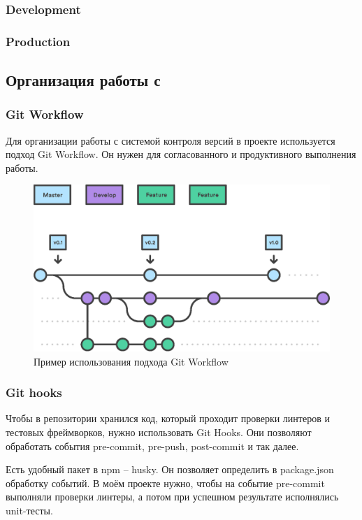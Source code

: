 \subsubsection{Development}
\subsubsection{Production}

\subsection{Организация работы с \textcite{git}}
\subsubsection{Git Workflow}
Для организации работы с системой контроля версий в проекте используется подход Git Workflow. Он нужен для согласованного и продуктивного выполнения работы.

\begin{figure}[h!]
    \begin{center}
        \includegraphics[scale=0.6]{images/git-workflow.eps}
    \end{center}
    \caption{Пример использования подхода Git Workflow}
\end{figure}

\subsubsection{Git hooks}
Чтобы в репозитории хранился код, который проходит проверки линтеров и тестовых фреймворков, нужно использовать Git Hooks. Они позволяют обработать события pre-commit, pre-push, post-commit и так далее.

Есть удобный пакет в npm -- husky. Он позволяет определить в package.json обработку событий. В моём проекте нужно, чтобы на событие pre-commit выполняли проверки линтеры, а потом при успешном результате исполнялись unit-тесты.


\clearpage